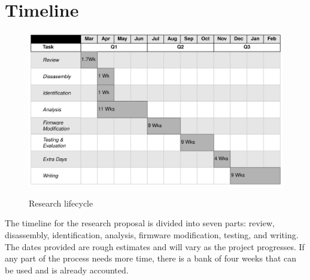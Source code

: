 \chapter{\leavevmode Timeline}
\label{chap:timeline}

\begin{figure}[!htb]%
  \centering
  {\includegraphics[width=160mm,scale=1]{Figures/timeline_gantt.drawio.png}}
  \caption{Research lifecycle}%
  \label{fig:research_lifecycle}%
\end{figure}

The timeline for the research proposal is divided into seven parts: review, disassembly, identification, analysis, firmware modification, testing, and writing. The dates provided are rough estimates and will vary as the project progresses. If any part of the process needs more time, there is a bank of four weeks that can be used and is already accounted.


